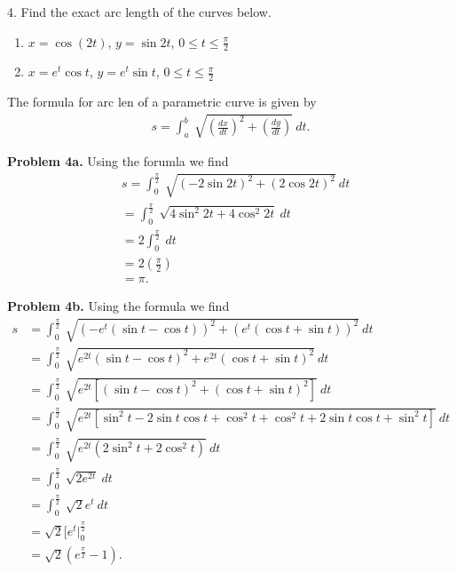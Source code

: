 \documentclass{report}
\begin{document}
    \pagebreak \bigbreak \noindent 
    \begin{mdframed}
        4. Find the exact arc length of the curves below.
        \begin{enumerate}[label=(\alph*)]
            \item $x=\cos{(2t)}$, $y=\sin{2t} $, $0 \leq t \leq \frac{\pi}{2} $
            \item $x= e^{t}\cos{t}$, $y=e^{t}\sin{t}$, $0 \leq t \leq\frac{\pi}{2} $
        \end{enumerate}
    \end{mdframed}
    \bigbreak \noindent 
    \begin{remark}
       The formula for arc len of a parametric curve is given by 
       \begin{align*}
        s = \int_{a}^{b}\ \sqrt{\left(\frac{dx}{dt}\right)^{2} + \left(\frac{dy}{dt}\right)}\ dt
       .\end{align*}
    \end{remark}
    \bigbreak \noindent 
    \textbf{Problem 4a.} Using the forumla we find
    \begin{align*}
       &s = \int_{0}^{\frac{\pi}{2}}\ \sqrt{\left(-2\sin{2t}\right)^{2} + \left(2\cos{2t}\right)^{2}}\ dt  \\
       &=\int_{0}^{\frac{\pi}{2}}\ \sqrt{4\sin^{2}{2t} + 4\cos^{2}{2t}}\ dt\\
       &=2\int_{0}^{\frac{\pi}{2}}\ dt \\
       &=2(\frac{\pi}{2}) \\
       &=\pi
    .\end{align*}

    \bigbreak \noindent 
    \textbf{Problem 4b.} Using the formula we find
    \begin{align*}
        s &= \int_{0}^{\frac{\pi}{2}}\ \sqrt{\left(-e^{t}(\sin{t}-\cos{t})\right)^{2} + \left(e^{t}(\cos{t} + \sin{t})\right)^{2}}\ dt \\
       &=\int_{0}^{\frac{\pi}{2}}\ \sqrt{e^{2t}(\sin{t}-\cos{t})^{2} + e^{2t}(\cos{t}+\sin{t})^{2}}\ dt \\
       &=\int_{0}^{\frac{\pi}{2}}\ \sqrt{e^{2t}\left[(\sin{t}-\cos{t})^{2}+(\cos{t}+\sin{t})^{2}\right]}\ dt \\
       &=\int_{0}^{\frac{\pi}{2}}\ \sqrt{e^{2t}\left[\sin^{2}{t}-2\sin{t}\cos{t}+\cos^{2}{t}+\cos^{2}{t}+2\sin{t}\cos{t}+\sin^{2}{t}\right]}\ dt\\
       &=\int_{0}^{\frac{\pi}{2}}\ \sqrt{e^{2t}(2\sin^{2}{t} + 2\cos^{2}{t})}\ dt \\
       &=\int_{0}^{\frac{\pi}{2}}\ \sqrt{2e^{2t}}\ dt \\
       &=\int_{0}^{\frac{\pi}{2}}\ \sqrt{2}e^{t}\ dt \\
       &=\sqrt{2}\bigg[e^{t}\bigg|^{\frac{\pi}{2}}_0 \\
       &=\sqrt{2}\left(e^{\frac{\pi}{2}} -1\right)
    .\end{align*}
    








    
    


     
 
\end{document}
